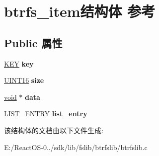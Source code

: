 \hypertarget{structbtrfs__item}{}\section{btrfs\+\_\+item结构体 参考}
\label{structbtrfs__item}
\subsection*{Public 属性}
\begin{DoxyCompactItemize}
\item 
\mbox{\label{structbtrfs__item_a096019f7ec25360a63115d9fcbfb39c2}} 
\hyperlink{struct_k_e_y}{K\+EY} {\bfseries key}
\item 
\mbox{\label{structbtrfs__item_afe3c1cc8f7c886efb7fa82db7132236b}} 
\hyperlink{_processor_bind_8h_a09f1a1fb2293e33483cc8d44aefb1eb1}{U\+I\+N\+T16} {\bfseries size}
\item 
\mbox{\label{structbtrfs__item_a0baca9561ed6b93abf10739b51abb203}} 
\hyperlink{interfacevoid}{void} $\ast$ {\bfseries data}
\item 
\mbox{\label{structbtrfs__item_a425974eb225b34128154eb725504d8e9}} 
\hyperlink{struct___l_i_s_t___e_n_t_r_y}{L\+I\+S\+T\+\_\+\+E\+N\+T\+RY} {\bfseries list\+\_\+entry}
\end{DoxyCompactItemize}


该结构体的文档由以下文件生成\+:\begin{DoxyCompactItemize}
\item 
E\+:/\+React\+O\+S-\/0../sdk/lib/fslib/btrfslib/btrfslib.\+c\end{DoxyCompactItemize}
